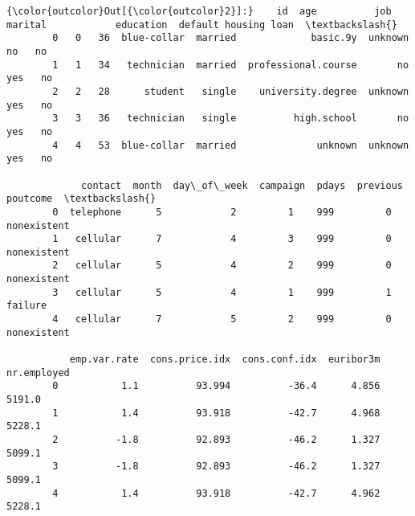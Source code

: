 \documentclass[11pt]{article}
\begin{document}
\begin{Verbatim}[commandchars=\\\{\}]
{\color{outcolor}Out[{\color{outcolor}2}]:}    id  age          job  marital            education  default housing loan  \textbackslash{}
        0   0   36  blue-collar  married             basic.9y  unknown      no   no   
        1   1   34   technician  married  professional.course       no     yes   no   
        2   2   28      student   single    university.degree  unknown     yes   no   
        3   3   36   technician   single          high.school       no     yes   no   
        4   4   53  blue-collar  married              unknown  unknown     yes   no   
        
             contact  month  day\_of\_week  campaign  pdays  previous     poutcome  \textbackslash{}
        0  telephone      5            2         1    999         0  nonexistent   
        1   cellular      7            4         3    999         0  nonexistent   
        2   cellular      5            4         2    999         0  nonexistent   
        3   cellular      5            4         1    999         1      failure   
        4   cellular      7            5         2    999         0  nonexistent   
        
           emp.var.rate  cons.price.idx  cons.conf.idx  euribor3m  nr.employed  
        0           1.1          93.994          -36.4      4.856       5191.0  
        1           1.4          93.918          -42.7      4.968       5228.1  
        2          -1.8          92.893          -46.2      1.327       5099.1  
        3          -1.8          92.893          -46.2      1.327       5099.1  
        4           1.4          93.918          -42.7      4.962       5228.1  
\end{Verbatim}
            
\end{document}
